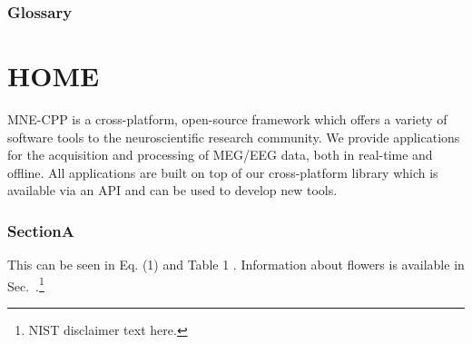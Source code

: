 \documentclass[12pt, twoside]{article}
\begin{document}
\fancyfoot[LE,RO]{\thepage}



{
  \hypersetup{linkcolor=black}
  \tableofcontents
  \vfill
  \pagebreak
  \section*{Glossary}
  \pagebreak
}


\part{HOME}
\label{sec:intro}
MNE-CPP is a cross-platform, open-source framework which offers a variety of software tools to the neuroscientific research community. We provide applications for the acquisition and processing of MEG/EEG data, both in real-time and offline. All applications are built on top of our cross-platform library which is available via an API and can be used to develop new tools.
\blindtext[2]
\section{SectionA}\label{sec:SectionA}
\blindtext[3]
This can be seen in Eq. (1) and Table 1 \cite{Roberts1982}. Information about flowers is available in Sec.~\ref{sec:intro}.\footnote{NIST disclaimer text here.}
\end{document}
